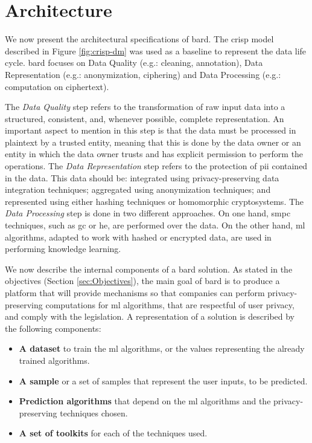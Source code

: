 
\section{Architecture}
\label{sec:Architecture}


We now present the architectural specifications of \ac{bard}. The \ac{crisp} model described in Figure \ref{fig:crisp-dm} was used as a baseline to represent the data life cycle. \ac{bard} focuses on Data Quality (e.g.: cleaning, annotation), Data Representation (e.g.: anonymization, ciphering) and Data Processing (e.g.: computation on ciphertext).

The \emph{Data Quality} step refers to the transformation of raw input data into a structured, consistent, and, whenever possible, complete representation. An important aspect to mention in this step is that the data must be processed in plaintext by a trusted entity, meaning that this is done by the data owner or an entity in which the data owner trusts and has explicit permission to perform the operations.
The \emph{Data Representation} step refers to the protection of \ac{pii} contained in the data. This data should be: integrated using privacy-preserving data integration techniques; aggregated using anonymization techniques; and represented using either hashing techniques or homomorphic cryptosystems.
The \emph{Data Processing} step is done in two different approaches. On one hand, \ac{smpc} techniques, such as \ac{gc} or \ac{he}, are performed over the data. On the other hand, \ac{ml} algorithms, adapted to work with hashed or encrypted data, are used in performing knowledge learning.

We now describe the internal components of a \ac{bard} solution.
As stated in the objectives (Section \ref{sec:Objectives}), the main goal of \ac{bard} is to produce a platform that will provide mechanisms so that companies can perform privacy-preserving computations for \ac{ml} algorithms, that are respectful of user privacy, and comply with the legislation. A representation of a solution is described by the following components: 
\begin{itemize}
	\item \textbf{A dataset} to train the \ac{ml} algorithms, or the values representing the already trained algorithms.
	\item \textbf{A sample} or a set of samples that represent the user inputs, to be predicted.
	\item \textbf{Prediction algorithms} that depend on the \ac{ml} algorithms and the privacy-preserving techniques chosen.
	\item \textbf{A set of toolkits} for each of the techniques used.
\end{itemize}

